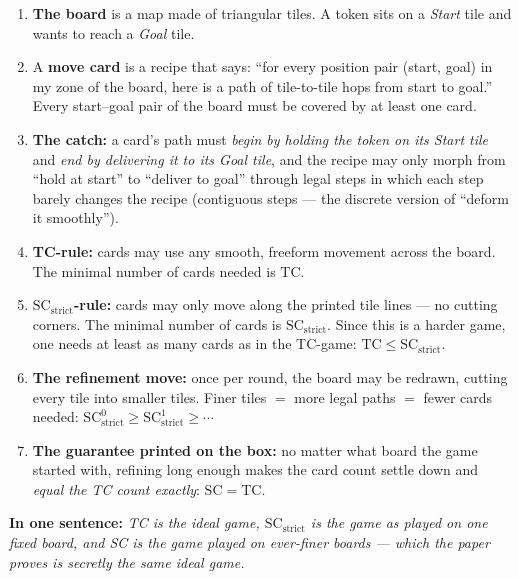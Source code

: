 \documentclass[11pt]{article}
\theoremstyle{definition}
\begin{document}
\begin{enumerate}
  \item \textbf{The board} is a map made of triangular tiles. A token sits on a
  \emph{Start} tile and wants to reach a \emph{Goal} tile.
  \item A \textbf{move card} is a recipe that says: ``for every position pair
  (start, goal) in my zone of the board, here is a path of tile-to-tile hops
  from start to goal.'' Every start--goal pair of the board must be covered by
  at least one card.
  \item \textbf{The catch:} a card's path must \emph{begin by holding the token
  on its Start tile} and \emph{end by delivering it to its Goal tile}, and the
  recipe may only morph from ``hold at start'' to ``deliver to goal'' through
  legal steps in which each step barely changes the recipe (contiguous steps ---
  the discrete version of ``deform it smoothly'').
  \item \textbf{TC-rule:} cards may use any smooth, freeform movement across the
  board. The minimal number of cards needed is $\mathrm{TC}$.
  \item \textbf{$\mathrm{SC}_{\mathrm{strict}}$-rule:} cards may only move along
  the printed tile lines --- no cutting corners. The minimal number of cards is
  $\mathrm{SC}_{\mathrm{strict}}$. Since this is a harder game, one needs at
  least as many cards as in the TC-game:
  $\mathrm{TC} \leq \mathrm{SC}_{\mathrm{strict}}$.
  \item \textbf{The refinement move:} once per round, the board may be redrawn,
  cutting every tile into smaller tiles. Finer tiles $=$ more legal paths $=$
  fewer cards needed:
  $\mathrm{SC}_{\mathrm{strict}}^0 \geq \mathrm{SC}_{\mathrm{strict}}^1 \geq \cdots$
  \item \textbf{The guarantee printed on the box:} no matter what board the game
  started with, refining long enough makes the card count settle down and
  \emph{equal the TC count exactly}: $\mathrm{SC} = \mathrm{TC}$.
\end{enumerate}

\medskip
\noindent\textbf{In one sentence:} \emph{TC is the ideal game,
$\mathrm{SC}_{\mathrm{strict}}$ is the game as played on one fixed board, and
SC is the game played on ever-finer boards --- which the paper proves is
secretly the same ideal game.}
\end{document}
